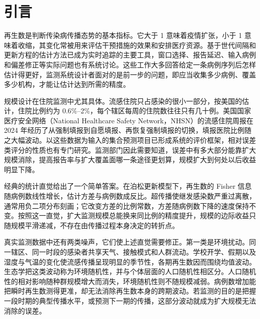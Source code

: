 \section{引言}
\label{sec:intro}

再生数是判断传染病传播态势的基本指标。它大于 1 意味着疫情扩张，小于 1 意味着收缩，其变化常被用来评估干预措施的效果和安排医疗资源。基于世代间隔和更新方程的估计方法已成为实时追踪的主要工具\citep{wallinga2004different, fraser2007estimating, cori2013new}，窗口选择、报告延迟、输入病例和偏差修正等实际问题也有系统讨论\citep{thompson2019improved, gostic2020practical, nouvellet2018simple, steyn2025primer}。这些工作大多回答给定一条病例序列后怎样估计得更好，监测系统设计者面对的是前一步的问题，即应当收集多少病例、覆盖多少机构，才能让估计达到所需的精度。

规模设计在住院监测中尤其具体。流感住院只占感染的很小一部分，按美国的估计，住院比例约为 0.6\%--2\%\citep{zhou2012hospitalizations, tokars2018seasonal}，每个辖区每周的住院数往往只有几十例。美国国家医疗安全网络（National Healthcare Safety Network，NHSN）的流感住院周报在 2024 年经历了从强制填报到自愿填报、再恢复强制填报的切换\citep{cdc2026nhsn}，填报医院比例随之大幅波动。以这些数据为输入的集合预测项目已形成系统的评价框架\citep{reich2019accuracy, cramer2022evaluation, mathis2024evaluation}，相对误差类评分的性质也有专门研究\citep{bosse2023scoring}。监测部门因此需要知道，误差中有多大部分能靠扩大规模消除，提高报告率与扩大覆盖面哪一条途径更划算，规模扩大到何处以后收益明显下降。

经典的统计直觉给出了一个简单答案。在泊松更新模型下，再生数的 Fisher 信息随病例数线性增长，估计方差与病例数成反比\citep{parag2022quantifying}。超传播使继发感染数严重过离散，通常用负二项分布刻画\citep{lloydsmith2005superspreading, endo2020estimating, kucharski2020early}；它改变方差的比例常数，方差随病例数下降的速度保持不变。按照这一直觉，扩大监测规模总能换来同比例的精度提升，规模的边际收益只随规模平滑递减，不存在由传播过程本身决定的转折点。

真实监测数据中还有两类噪声，它们使上述直觉需要修正。第一类是环境扰动。同一辖区、同一时段的感染者共享天气、接触模式和人群流动。学校开学、假期以及湿度与气温的变化使流感传播呈现明显的季节性，各期再生数因而围绕均值波动\citep{dalziel2018urbanization, rasmussen2011inference}。生态学把这类波动称为环境随机性，并与个体层面的人口随机性相区分。人口随机性的相对影响随种群规模增大而消失，环境随机性则不随规模减弱\citep{engen1998demographic, rohani2002determinism}。病例数增加能把瞬时再生数测得更准，却无法消除再生数本身的跨期波动。若监测的目的是把握一段时期的典型传播水平，或预测下一期的传播，这部分波动就成为扩大规模无法消除的误差。

